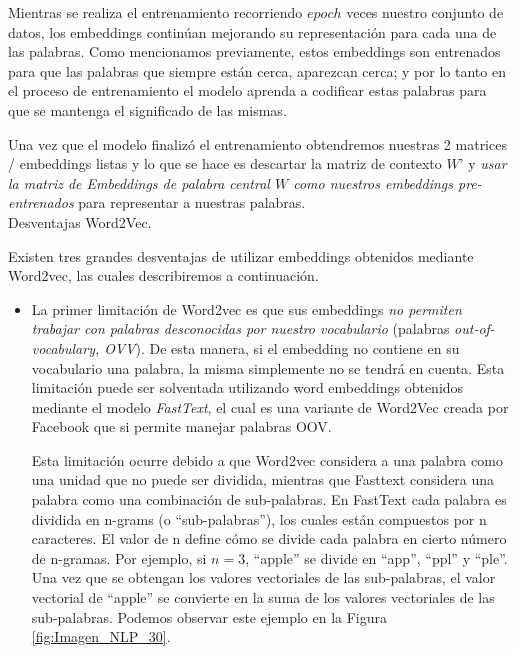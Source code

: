 \documentclass[12pt,a4paper]{article}
\makeatletter
\renewcommand\paragraph{\@startsection{paragraph}{4}{\z@}
            {-2.5ex\@plus -1ex \@minus -.25ex}
            {1.25ex \@plus .25ex}
            {\normalfont\normalsize\bfseries}}
\makeatother
\begin{document}
\begin{sloppypar}
Mientras se realiza el entrenamiento recorriendo $epoch$ veces nuestro conjunto de datos, los embeddings continúan mejorando su representación para cada una de las palabras. Como mencionamos previamente, estos embeddings son entrenados para que las palabras que siempre están cerca, aparezcan cerca; y por lo tanto en el proceso de entrenamiento el modelo aprenda a codificar estas palabras para que se mantenga el significado de las mismas. 

Una vez que el modelo finalizó el entrenamiento obtendremos nuestras 2 matrices / embeddings listas y lo que se hace es descartar la matriz de contexto $W’$ y \textit{usar la matriz de Embeddings de palabra central $W$ como nuestros embeddings pre-entrenados} para representar a nuestras palabras. 
\\

\paragraph{Desventajas Word2Vec.}\label{desv_word2vec}

Existen tres grandes desventajas de utilizar embeddings obtenidos mediante Word2vec, las cuales describiremos a continuación.

\begin{itemize}
\item La primer limitación\cite{NLP_28} de Word2vec es que sus embeddings \textit{no permiten trabajar con palabras desconocidas por nuestro vocabulario} (palabras \textit{out-of-vocabulary, OVV}). De esta manera, si el embedding no contiene en su vocabulario una palabra, la misma simplemente no se tendrá en cuenta. Esta limitación puede ser solventada utilizando word embeddings obtenidos mediante el modelo \textit{FastText}, el cual es una variante de Word2Vec creada por Facebook que si permite manejar palabras OOV. 

Esta limitación ocurre debido a que Word2vec considera a una palabra como una unidad que no puede ser dividida, mientras que Fasttext considera una palabra como una combinación de sub-palabras. En FastText cada palabra es dividida en n-grams (o “sub-palabras”), los cuales están compuestos por n caracteres. El valor de n define cómo se divide cada palabra en cierto número de n-gramas. Por ejemplo, si $n=3$, “apple” se divide en “app”, “ppl” y “ple”. Una vez que se obtengan los valores vectoriales de las sub-palabras, el valor vectorial de “apple” se convierte en la suma de los valores vectoriales de las sub-palabras. Podemos observar este ejemplo en la Figura \ref{fig:Imagen_NLP_30}.


\end{itemize}
\end{sloppypar}
\end{document}
